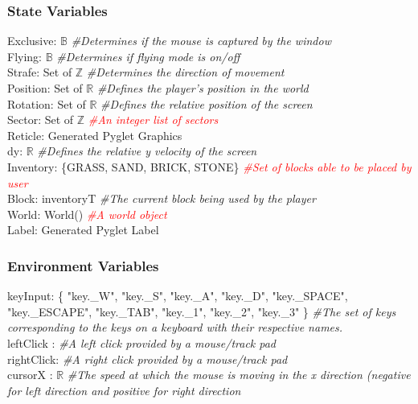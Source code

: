\documentclass[12pt]{article}
\begin{document}
\subsubsection* {State Variables}
Exclusive: $\mathbb{B}$\textit{ \#Determines if the mouse is captured by the window}\\
Flying: $\mathbb{B}$ \textit{ \#Determines if flying mode is on/off}\\
Strafe: Set of $\mathbb{Z}$ \textit{ \#Determines the direction of movement}\\
Position: Set of $\mathbb{R}$ \textit{ \#Defines the player's position in the world}\\
Rotation: Set of $\mathbb{R}$ \textit{ \#Defines the relative position of the screen}\\
Sector: Set of $\mathbb{Z}$ \textit{ \textcolor{red}{\#An integer list of sectors}}\\
Reticle: Generated Pyglet Graphics\\
dy: $\mathbb{R}$ \textit{ \#Defines the relative y velocity of the screen}\\
Inventory: \{GRASS, SAND, BRICK, STONE\} \textit{ \textcolor{red}{\#Set of blocks able to be placed by user}}\\
Block: inventoryT \textit{ \#The current block being used by the player}\\
World: World() \textit{ \textcolor{red}{\#A world object}}\\ 
Label: Generated Pyglet Label\\

\subsubsection* {Environment Variables}
keyInput: \{ "key.\_W", "key.\_S", "key.\_A", "key.\_D", "key.\_SPACE", "key.\_ESCAPE", "key.\_TAB", "key.\_1", "key.\_2", "key.\_3" \} \textit{ \#The set of keys corresponding to the keys on a keyboard with their respective names.} \\

\noindent leftClick : \textit{ \#A left click provided by a mouse/track pad}\\

\noindent rightClick: \textit{ \#A right click provided by a mouse/track pad}\\

\noindent cursorX : $\mathbb{R}$ \textit{ \#The speed at which the mouse is moving in the x direction (negative for left direction and positive for right direction}\\
\end{document}
